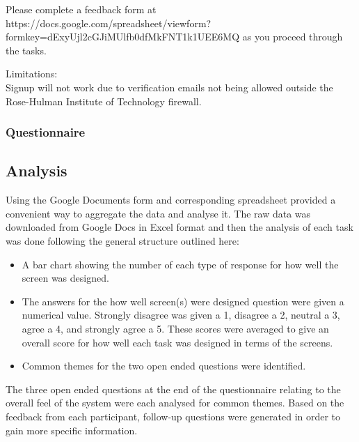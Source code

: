 Please complete a feedback form at https://docs.google.com/spreadsheet/viewform?formkey=dExyUjl2cGJiMUlfb0dfMkFNT1k1UEE6MQ as you proceed through the tasks.

Limitations:\\
Signup will not work due to verification emails not being allowed outside the Rose-Hulman Institute of Technology firewall.

\subsubsection{Questionnaire}


\subsection{Analysis}
Using the Google Documents form and corresponding spreadsheet provided a convenient way to aggregate the data and analyse it. The raw data was downloaded from Google Docs in Excel format and then the analysis of each task was done following the general structure outlined here:
\begin{itemize}
\item A bar chart showing the number of each type of response for how well the screen was designed.
\item The answers for the how well screen(s) were designed question were given a numerical value. Strongly disagree was given a 1, disagree a 2, neutral a 3, agree a 4, and strongly agree a 5. These scores were averaged to give an overall score for how well each task was designed in terms of the screens.
\item Common themes for the two open ended questions were identified.
\end{itemize}
The three open ended questions at the end of the questionnaire relating to the overall feel of the system were each analysed for common themes. Based on the feedback from each participant, follow-up questions were generated in order to gain more specific information.

